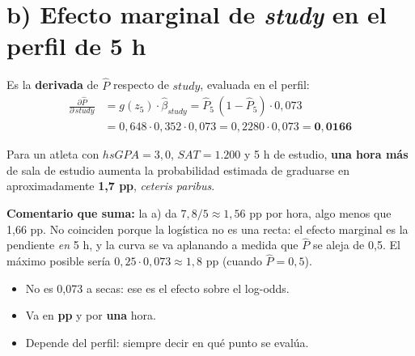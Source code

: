 \documentclass[11pt,a4paper]{article}
\begin{document}
\section*{b) Efecto marginal de \emph{study} en el perfil de 5 h}
Es la \textbf{derivada} de $\hat P$ respecto de $study$, evaluada en el perfil:
\begin{align*}
\frac{\partial \hat P}{\partial\, study} &= g(z_5)\cdot\hat\beta_{study}=\hat P_5\,(1-\hat P_5)\cdot 0{,}073\\
&= 0{,}648\cdot0{,}352\cdot0{,}073 = 0{,}2280\cdot0{,}073=\mathbf{0{,}0166}
\end{align*}
\begin{ejemplar}
Para un atleta con $hsGPA=3{,}0$, $SAT=1.200$ y 5 h de estudio, \textbf{una hora más} de sala de estudio aumenta la probabilidad estimada de graduarse en aproximadamente \textbf{1,7 pp}, \emph{ceteris paribus}.
\end{ejemplar}
\noindent\textbf{Comentario que suma:} la a) da $7{,}8/5\approx1{,}56$ pp por hora, algo menos que 1,66 pp. No coinciden porque la logística no es una recta: el efecto marginal es la pendiente \emph{en} 5 h, y la curva se va aplanando a medida que $\hat P$ se aleja de 0,5. El máximo posible sería $0{,}25\cdot0{,}073\approx1{,}8$ pp (cuando $\hat P=0{,}5$).
\begin{trampa}
\begin{itemize}[leftmargin=*,itemsep=0pt,topsep=0pt]
\item No es 0,073 a secas: ese es el efecto sobre el log-odds.
\item Va en \textbf{pp} y por \textbf{una} hora.
\item Depende del perfil: siempre decir en qué punto se evalúa.
\end{itemize}
\end{trampa}

\end{document}
